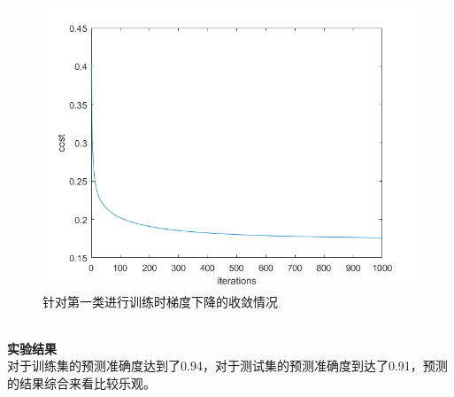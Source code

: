 \documentclass[a4paper,UTF8]{article}
\numberwithin{equation}{section}
\begin{document}
\begin{figure}[ht]
	\centering
	\includegraphics[scale=0.4]{cost.png}
	\caption{针对第一类进行训练时梯度下降的收敛情况}
	\label{fig:label}
\end{figure}\\
\noindent\textbf{实验结果}\\
对于训练集的预测准确度达到了0.94，对于测试集的预测准确度到达了0.91，预测的结果综合来看比较乐观。\\\\
\end{document}
